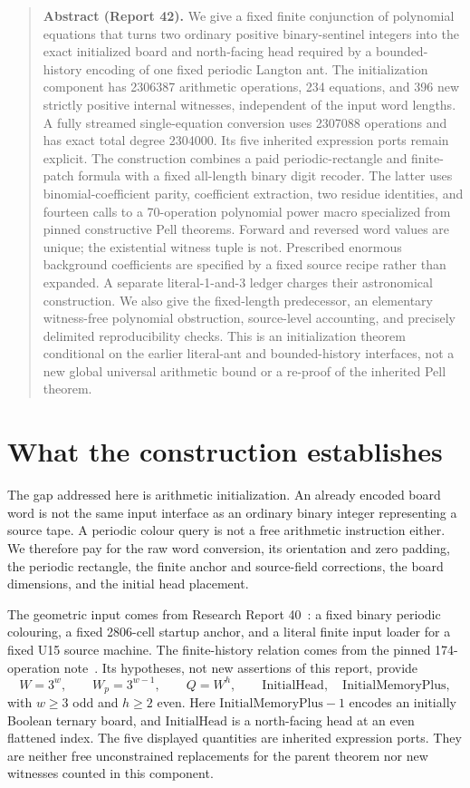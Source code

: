 \documentclass[11pt,letterpaper]{article}
\theoremstyle{definition}\newtheorem{definition}[theorem]{Definition}
\theoremstyle{remark}\newtheorem{remark}[theorem]{Remark}
\newcommand{\IM}{\mathrm{InitialMemoryPlus}}\newcommand{\IH}{\mathrm{InitialHead}}
\begin{document}
\begin{quote}\small\noindent\textbf{Abstract (Report 42).} We give a fixed finite conjunction of polynomial equations that turns two ordinary positive binary-sentinel integers into the exact initialized board and north-facing head required by a bounded-history encoding of one fixed periodic Langton ant. The initialization component has 2306387 arithmetic operations, 234 equations, and 396 new strictly positive internal witnesses, independent of the input word lengths. A fully streamed single-equation conversion uses 2307088 operations and has exact total degree 2304000. Its five inherited expression ports remain explicit. The construction combines a paid periodic-rectangle and finite-patch formula with a fixed all-length binary digit recoder. The latter uses binomial-coefficient parity, coefficient extraction, two residue identities, and fourteen calls to a 70-operation polynomial power macro specialized from pinned constructive Pell theorems. Forward and reversed word values are unique; the existential witness tuple is not. Prescribed enormous background coefficients are specified by a fixed source recipe rather than expanded. A separate literal-1-and-3 ledger charges their astronomical construction. We also give the fixed-length predecessor, an elementary witness-free polynomial obstruction, source-level accounting, and precisely delimited reproducibility checks. This is an initialization theorem conditional on the earlier literal-ant and bounded-history interfaces, not a new global universal arithmetic bound or a re-proof of the inherited Pell theorem.
\end{quote}
\section{What the construction establishes}\label{ptr:ai:sec:result}
The gap addressed here is arithmetic initialization. An already encoded board word is not the same input interface as an ordinary binary integer representing a source tape. A periodic colour query is not a free arithmetic instruction either. We therefore pay for the raw word conversion, its orientation and zero padding, the periodic rectangle, the finite anchor and source-field corrections, the board dimensions, and the initial head placement.

The geometric input comes from Research Report 40~\cite{ptr:ai:report40}: a fixed binary periodic colouring, a fixed 2806-cell startup anchor, and a literal finite input loader for a fixed U15 source machine. The finite-history relation comes from the pinned 174-operation note~\cite{ptr:ai:history}. Its hypotheses, not new assertions of this report, provide
\begin{equation}\label{ptr:ai:eq:parentports}
 W=3^w,\qquad W_p=3^{w-1},\qquad Q=W^h,
 \qquad \IH,\quad \IM,
\end{equation}
with $w\ge3$ odd and $h\ge2$ even. Here $\IM-1$ encodes an initially Boolean ternary board, and $\IH$ is a north-facing head at an even flattened index. The five displayed quantities are inherited expression ports. They are neither free unconstrained replacements for the parent theorem nor new witnesses counted in this component.
\end{document}
